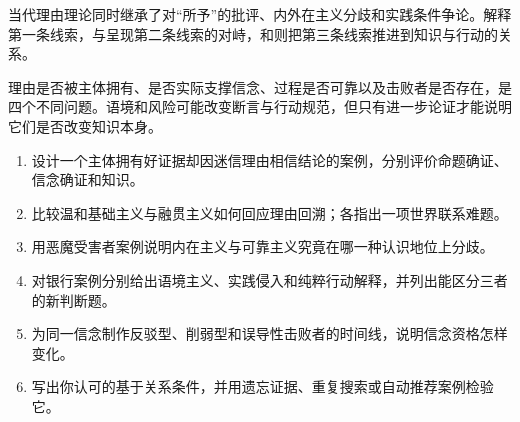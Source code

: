 当代理由理论同时继承了对“所予”的批评、内外在主义分歧和实践条件争论。\textcite{sellars1997}解释第一条线索，\textcite{alston1988}与\textcite{feldman2001}呈现第二条线索的对峙，\textcite{fantl2009}和\textcite{weatherson2005}则把第三条线索推进到知识与行动的关系。

\begin{checkpoint}
理由是否被主体拥有、是否实际支撑信念、过程是否可靠以及击败者是否存在，是四个不同问题。语境和风险可能改变断言与行动规范，但只有进一步论证才能说明它们是否改变知识本身。
\end{checkpoint}

\begin{exercises}
\begin{enumerate}
  \item 设计一个主体拥有好证据却因迷信理由相信结论的案例，分别评价命题确证、信念确证和知识。
  \item 比较温和基础主义与融贯主义如何回应理由回溯；各指出一项世界联系难题。
  \item 用恶魔受害者案例说明内在主义与可靠主义究竟在哪一种认识地位上分歧。
  \item 对银行案例分别给出语境主义、实践侵入和纯粹行动解释，并列出能区分三者的新判断题。
  \item 为同一信念制作反驳型、削弱型和误导性击败者的时间线，说明信念资格怎样变化。
  \item 写出你认可的基于关系条件，并用遗忘证据、重复搜索或自动推荐案例检验它。
\end{enumerate}
\end{exercises}

\clearpage
\begin{readingmap}
\end{readingmap}
